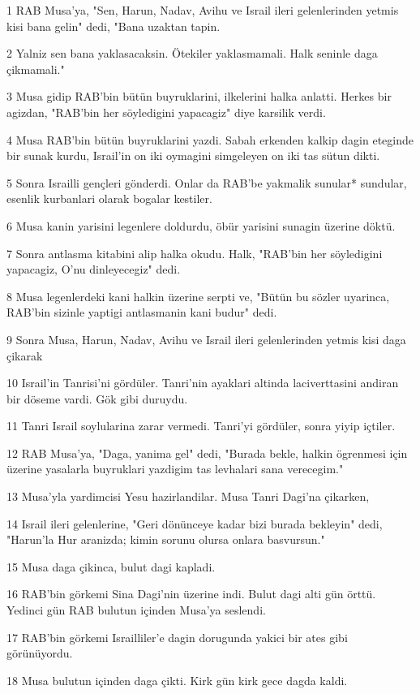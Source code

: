 \par 1 RAB Musa'ya, "Sen, Harun, Nadav, Avihu ve Israil ileri gelenlerinden yetmis kisi bana gelin" dedi, "Bana uzaktan tapin.
\par 2 Yalniz sen bana yaklasacaksin. Ötekiler yaklasmamali. Halk seninle daga çikmamali."
\par 3 Musa gidip RAB'bin bütün buyruklarini, ilkelerini halka anlatti. Herkes bir agizdan, "RAB'bin her söyledigini yapacagiz" diye karsilik verdi.
\par 4 Musa RAB'bin bütün buyruklarini yazdi. Sabah erkenden kalkip dagin eteginde bir sunak kurdu, Israil'in on iki oymagini simgeleyen on iki tas sütun dikti.
\par 5 Sonra Israilli gençleri gönderdi. Onlar da RAB'be yakmalik sunular* sundular, esenlik kurbanlari olarak bogalar kestiler.
\par 6 Musa kanin yarisini legenlere doldurdu, öbür yarisini sunagin üzerine döktü.
\par 7 Sonra antlasma kitabini alip halka okudu. Halk, "RAB'bin her söyledigini yapacagiz, O'nu dinleyecegiz" dedi.
\par 8 Musa legenlerdeki kani halkin üzerine serpti ve, "Bütün bu sözler uyarinca, RAB'bin sizinle yaptigi antlasmanin kani budur" dedi.
\par 9 Sonra Musa, Harun, Nadav, Avihu ve Israil ileri gelenlerinden yetmis kisi daga çikarak
\par 10 Israil'in Tanrisi'ni gördüler. Tanri'nin ayaklari altinda laciverttasini andiran bir döseme vardi. Gök gibi duruydu.
\par 11 Tanri Israil soylularina zarar vermedi. Tanri'yi gördüler, sonra yiyip içtiler.
\par 12 RAB Musa'ya, "Daga, yanima gel" dedi, "Burada bekle, halkin ögrenmesi için üzerine yasalarla buyruklari yazdigim tas levhalari sana verecegim."
\par 13 Musa'yla yardimcisi Yesu hazirlandilar. Musa Tanri Dagi'na çikarken,
\par 14 Israil ileri gelenlerine, "Geri dönünceye kadar bizi burada bekleyin" dedi, "Harun'la Hur aranizda; kimin sorunu olursa onlara basvursun."
\par 15 Musa daga çikinca, bulut dagi kapladi.
\par 16 RAB'bin görkemi Sina Dagi'nin üzerine indi. Bulut dagi alti gün örttü. Yedinci gün RAB bulutun içinden Musa'ya seslendi.
\par 17 RAB'bin görkemi Israilliler'e dagin dorugunda yakici bir ates gibi görünüyordu.
\par 18 Musa bulutun içinden daga çikti. Kirk gün kirk gece dagda kaldi.

